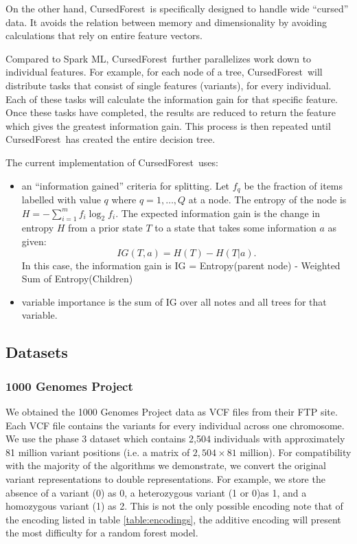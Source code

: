 \documentclass[10pt,letterpaper]{article}
\newcommand{\cursedforest}{{\sc CursedForest}}
\begin{document}
On the other hand, \cursedforest\  is specifically designed to handle wide ``cursed'' data. It avoids the relation
between memory and dimensionality by avoiding calculations that rely on entire feature vectors.

Compared to Spark ML, \cursedforest\ further parallelizes work down to individual features.  For example, for each node of
a tree, \cursedforest\ will distribute tasks that consist of single features (variants), for every individual.  Each of
these tasks will calculate the information gain for that specific feature.  Once these tasks have completed, the results
are reduced to return the feature which gives the greatest information gain.  This process is then repeated until
\cursedforest\ has created the entire decision tree.

The current implementation of \cursedforest\ uses:
\begin{itemize}
\item an ``information gained'' criteria for splitting. Let $f_q$ be the fraction of items labelled with value $q$ where $q = 1,
  \ldots, Q$ at a node. The entropy of the node is $H = - \sum^{m}_{i=1} f_i \log^{}_2 f_i.$
The expected information gain is the change in entropy $H$ from a prior state $T$ to a state that takes some
information $a$ as given: 
\[ IG(T,a) = H(T) - H(T|a). \]
In this case, the information gain is IG = Entropy(parent node) - Weighted Sum of Entropy(Children)
\item variable importance is the sum of IG over all notes and all trees for that variable.
\end{itemize}


\subsection{Datasets}
\subsubsection{1000 Genomes Project}
We obtained the 1000 Genomes Project data as VCF files from their FTP site.  Each VCF file contains the variants for
every individual across one chromosome.  We use the phase 3 dataset which contains 2,504 individuals with approximately
81 million variant positions (i.e. a matrix of $2,504 \times 81$ million).  For compatibility with the majority of the
algorithms we demonstrate, we convert the original variant representations to double representations.  For example, we
store the absence of a variant (0) as 0, a heterozygous variant (1 or 0)as 1,  and a
homozygous variant (1) as 2.  This is not the only possible encoding \cite{Goldstein.et.al.2011} note that of
the encoding listed in table \ref{table:encodings}, the additive encoding will present the most difficulty for a random
forest model.
\end{document}
